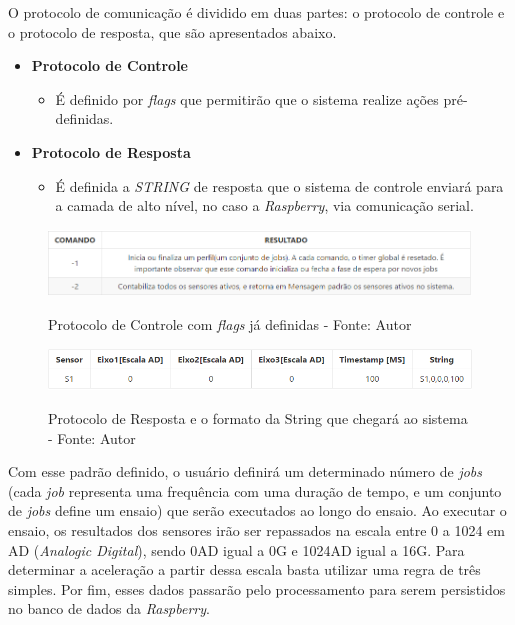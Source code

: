 O protocolo de comunicação é dividido em duas partes: o protocolo de controle e o protocolo de resposta, que são apresentados abaixo.

\begin{itemize}
    \item \textbf{Protocolo de Controle}
    \begin{itemize}
        \item É definido por \textit{flags} que permitirão que o sistema realize ações pré-definidas.
    \end{itemize}
    \item \textbf{Protocolo de Resposta}
    \begin{itemize}
        \item É definida a \textit{STRING} de resposta que o sistema de controle enviará para a camada de alto nível, no caso a \textit{Raspberry}, via 
        comunicação serial.
    \end{itemize}
\end{itemize}

\begin{figure}[H]
\centering
\includegraphics[keepaspectratio=true,scale=0.7]{figuras/protocolo_controle.png}
\label{fig:protocolo_controle}
\caption{Protocolo de Controle com \textit{flags} já definidas - Fonte: Autor}
\end{figure}

\begin{figure}[H]
\centering
\includegraphics[keepaspectratio=true,scale=0.8]{figuras/protocolo_string.png}
\label{fig:protocolo_string}
\caption{Protocolo de Resposta e o formato da String que chegará ao sistema - Fonte: Autor}
\end{figure}

Com esse padrão definido, o usuário definirá um determinado número de \textit{jobs} (cada \textit{job} representa uma frequência com uma duração de tempo, 
e um conjunto de \textit{jobs} define um ensaio) que serão executados ao longo do ensaio. Ao executar o ensaio, os resultados dos sensores irão ser 
repassados na escala entre 0 a 1024 em AD (\textit{Analogic Digital}), sendo 0AD igual a 0G e 1024AD igual a 16G. Para determinar a aceleração a 
partir dessa escala basta utilizar uma regra de três simples. Por fim, esses dados passarão pelo processamento para serem persistidos no
banco de dados da \textit{Raspberry}.

